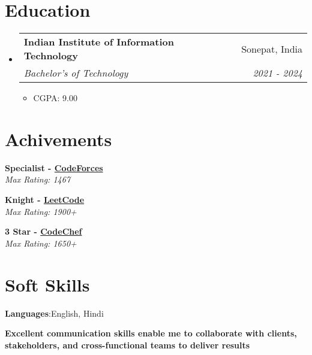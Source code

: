 \documentclass[letterpaper,11pt]{article}
\makeatletter
\newcommand{\resumeItem}[1]{
  \item\small{
    {#1 \vspace{-2pt}}
  }
}
\newcommand{\resumeSubheading}[4]{
  \vspace{-2pt}\item
    \begin{tabular*}{0.97\textwidth}[t]{l@{\extracolsep{\fill}}r}
      \textbf{#1} & #2 \\
      \textit{\small#3} & \textit{\small #4} \\
    \end{tabular*}\vspace{-7pt}
}
\newcommand{\resumeSubHeadingListStart}{\begin{itemize}[leftmargin=0.15in, label={}]}
\newcommand{\resumeSubHeadingListEnd}{\end{itemize}}
\newcommand{\resumeItemListStart}{\begin{itemize}}
\newcommand{\resumeItemListEnd}{\end{itemize}\vspace{-5pt}}
\makeatother
\begin{document}
\section{Education}
  \resumeSubHeadingListStart

    \resumeSubheading
      {Indian Institute of Information Technology}{Sonepat, India}
      {Bachelor's of Technology}{2021 - 2024}
        \resumeItemListStart
            \resumeItem{CGPA: 9.00}
        \resumeItemListEnd  

  \resumeSubHeadingListEnd

\section{Achivements}
  \begin{itemize}[leftmargin=0.15in, label={}]
    \small{\item{
     \textbf{Specialist - \href{https://codeforces.com/profile/Average_Comder}{CodeForces}} \\
     \textit{Max Rating: 1467} \\
    }}
\small{\item{
     \textbf{Knight - \href{https://leetcode.com/Rishu_sh/}{LeetCode}} \\
     \textit{Max Rating: 1900+} \\
    }}
\small{\item{
     \textbf{3 Star - \href{https://www.codechef.com/users/rishush}{CodeChef}} \\
     \textit{Max Rating: 1650+} \\
    }}
  \end{itemize}

\section{Soft Skills}
  \begin{itemize}[leftmargin=0.15in, label={}]
    \small{\item{
     \textbf{Languages}{:English, Hindi} \\
    }}
\small{\item{
     \textbf{Excellent communication skills enable me to collaborate with clients,
stakeholders, and cross-functional teams to deliver results} \\
    }}
  \end{itemize}

\end{document}
